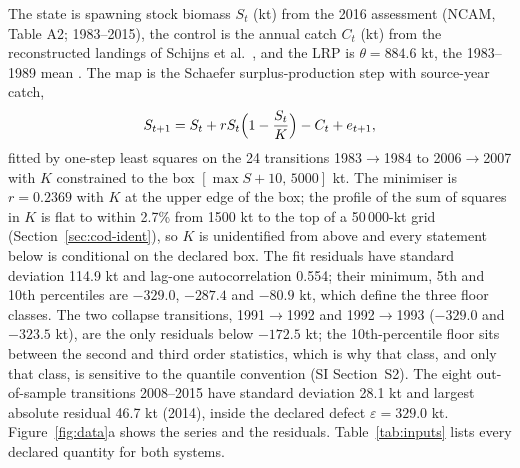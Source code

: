 \documentclass[11pt,a4paper]{article}
\theoremstyle{plain}
\theoremstyle{definition}
\theoremstyle{remark}
\newcommand{\LRP}{\theta}
\begin{document}
The state is spawning stock biomass $S_t$ (kt) from the 2016 assessment (NCAM, Table A2; 1983--2015), the control is the annual catch $C_t$ (kt) from the reconstructed landings of Schijns et al.~\cite{Schijns2021}, and the LRP is $\LRP=884.6$ kt, the 1983--1989 mean \cite{DFO2016}. The map is the Schaefer surplus-production step with source-year catch,
\begin{equation}\label{eq:cod-map}
S_{t+1}=S_t+rS_t\Bigl(1-\frac{S_t}{K}\Bigr)-C_t+e_{t+1},
\end{equation}
fitted by one-step least squares on the 24 transitions 1983$\to$1984 to 2006$\to$2007 with $K$ constrained to the box $[\max S+10,\,5000]$ kt. The minimiser is $r=0.2369$ with $K$ at the upper edge of the box; the profile of the sum of squares in $K$ is flat to within 2.7\% from 1500 kt to the top of a 50\,000-kt grid (Section~\ref{sec:cod-ident}), so $K$ is unidentified from above and every statement below is conditional on the declared box. The fit residuals have standard deviation 114.9 kt and lag-one autocorrelation 0.554; their minimum, 5th and 10th percentiles are $-329.0$, $-287.4$ and $-80.9$ kt, which define the three floor classes. The two collapse transitions, 1991$\to$1992 and 1992$\to$1993 ($-329.0$ and $-323.5$ kt), are the only residuals below $-172.5$ kt; the 10th-percentile floor sits between the second and third order statistics, which is why that class, and only that class, is sensitive to the quantile convention (SI Section~S2). The eight out-of-sample transitions 2008--2015 have standard deviation 28.1 kt and largest absolute residual 46.7 kt (2014), inside the declared defect $\varepsilon=329.0$ kt. Figure~\ref{fig:data}a shows the series and the residuals. Table~\ref{tab:inputs} lists every declared quantity for both systems.
\end{document}
